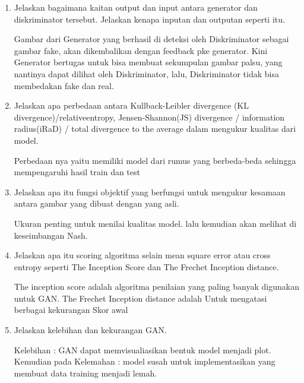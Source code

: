 \begin{enumerate}
	\item Jelaskan bagaimana kaitan output dan input antara generator dan diskriminator tersebut. Jelaskan kenapa inputan dan outputan seperti itu.
	\hfill\break

	Gambar dari Generator yang berhasil di deteksi oleh Diskriminator sebagai gambar fake, akan dikembalikan dengan feedback pke generator. Kini Generator bertugas untuk bisa membuat sekumpulan gambar palsu, yang nantinya dapat dilihat oleh Diskriminator, lalu, Diskriminator tidak bisa membedakan fake dan real.

	\item Jelaskan apa perbedaan antara Kullback-Leibler divergence (KL divergence)/relativeentropy, Jensen-Shannon(JS) divergence / information radius(iRaD) / total divergence to the average dalam mengukur kualitas dari model.
	\hfill\break

	Perbedaan nya yaitu memiliki model dari rumus yang berbeda-beda sehingga mempengaruhi hasil train dan test

	\item Jelaskan apa itu fungsi objektif yang berfungsi untuk mengukur kesamaan antara gambar yang dibuat dengan yang asli.
	\hfill\break

	Ukuran penting untuk menilai kualitas model. lalu kemudian akan melihat di keseimbangan Nash.

	\item Jelaskan apa itu scoring algoritma selain mean square error atau cross entropy seperti The Inception Score dan The Frechet Inception distance.
	\hfill\break

	The inception score adalah algoritma penilaian yang paling banyak digunakan untuk GAN. The Frechet Inception distance adalah Untuk mengatasi berbagai kekurangan Skor awal

	\item Jelaskan kelebihan dan kekurangan GAN.
	\hfill\break

	Kelebihan : GAN dapat memvisualiasikan bentuk model menjadi plot. Kemudian pada Kelemahan : model susah untuk implementasikan yang membuat data training menjadi lemah.

\end{enumerate}

